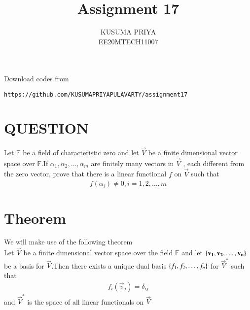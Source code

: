 \documentclass[journal,12pt,twocolumn]{IEEEtran}
\begin{document}
\renewcommand{\thefigure}{\theproblem}

\def\putbox#1#2#3{\makebox[0in][l]{\makebox[#1][l]{}\raisebox{\baselineskip}[0in][0in]{\raisebox{#2}[0in][0in]{#3}}}}
     \def\rightbox#1{\makebox[0in][r]{#1}}
     \def\centbox#1{\makebox[0in]{#1}}
     \def\topbox#1{\raisebox{-\baselineskip}[0in][0in]{#1}}
     \def\midbox#1{\raisebox{-0.5\baselineskip}[0in][0in]{#1}}
\vspace{3cm}
\title{Assignment 17}
\author{KUSUMA PRIYA\\EE20MTECH11007}

\maketitle
\newpage

\bigskip
\renewcommand{\thefigure}{\theenumi}
\renewcommand{\thetable}{\theenumi}
Download codes from 
%
\begin{lstlisting}
https://github.com/KUSUMAPRIYAPULAVARTY/assignment17
\end{lstlisting}
%
 
 \section{QUESTION}
Let $\mathbb{F}$ be a field of characteristic zero and let $\vec{V}$ be a finite dimensional vector space over  $\mathbb{F}$.If $\alpha_1,\alpha_2,\hdots,\alpha_m$ are finitely many vectors in $\vec{V}$ , each different from the zero vector, prove that there is a linear functional $f$ on $\vec{V}$ such that
\begin{align}
    f(\alpha_i) \neq 0, i=1,2,\hdots,m
\end{align}
%

\section{Theorem}
We will make use of the following theorem\\
Let $\vec{V}$ be a finite dimensional vector space over the field $\mathbb{F}$ and let $\left\{\mathbf{v_1},\mathbf{v_2},\hdots,\mathbf{v_n}\right\}$ be a basis for $\vec{V}$.Then there exists a unique dual basis $\left\{f_1,f_2,\hdots,f_n\right\}$ for $\vec{V}^*$ such that
\begin{align}
    f_i(\vec{v}_j)=\delta_{ij}\label{1}
\end{align}
and $\vec{V}^*$ is the space of all linear functionals on $\vec{V}$
\end{document}
